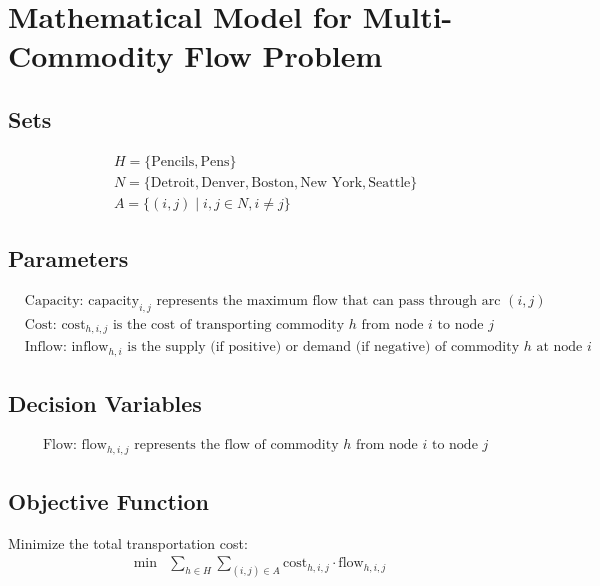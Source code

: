 \documentclass{article}
\begin{document}
	
	\section*{Mathematical Model for Multi-Commodity Flow Problem}
	
	\subsection*{Sets}
	\begin{align*}
		& H = \{ \text{Pencils}, \text{Pens} \} \\
		& N = \{ \text{Detroit}, \text{Denver}, \text{Boston}, \text{New York}, \text{Seattle} \} \\
		& A = \{ (i, j) \mid i, j \in N, i \neq j \}
	\end{align*}
	
	\subsection*{Parameters}
	\begin{align*}
		& \text{Capacity: } \text{capacity}_{i,j} \text{ represents the maximum flow that can pass through arc } (i, j) \\
		& \text{Cost: } \text{cost}_{h,i,j} \text{ is the cost of transporting commodity } h \text{ from node } i \text{ to node } j \\
		& \text{Inflow: } \text{inflow}_{h,i} \text{ is the supply (if positive) or demand (if negative) of commodity } h \text{ at node } i
	\end{align*}
	
	\subsection*{Decision Variables}
	\begin{align*}
		& \text{Flow: } \text{flow}_{h,i,j} \text{ represents the flow of commodity } h \text{ from node } i \text{ to node } j
	\end{align*}
	
	\subsection*{Objective Function}
	Minimize the total transportation cost:
	\begin{align*}
		\min & \sum_{h \in H} \sum_{(i,j) \in A} \text{cost}_{h,i,j} \cdot \text{flow}_{h,i,j}
	\end{align*}
	
\end{document}
